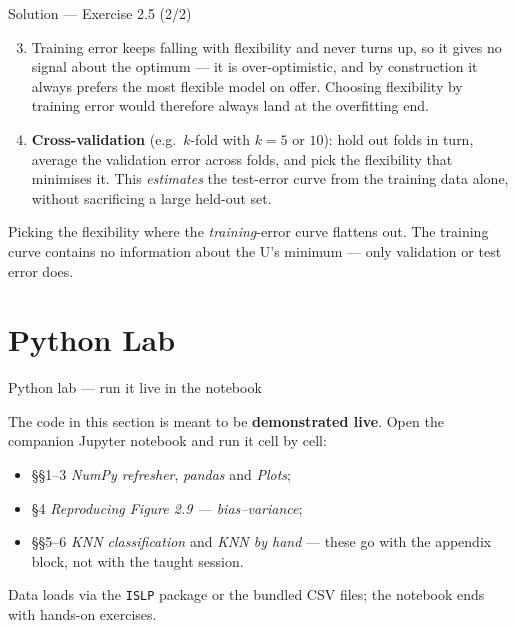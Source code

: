 \documentclass[aspectratio=169,11pt]{beamer}
\begin{document}
\begin{frame}{Solution --- Exercise 2.5 (2/2)}
\begin{solutionbox}
\begin{enumerate}\setcounter{enumi}{2}
  \item Training error keeps falling with flexibility and never turns
        up, so it gives no signal about the optimum --- it is
        over-optimistic, and by construction it always prefers the
        most flexible model on offer. Choosing flexibility by training
        error would therefore always land at the overfitting end.
  \item \textbf{Cross-validation} (e.g.\ $k$-fold with $k=5$ or
        $10$): hold out folds in turn, average the validation error
        across folds, and pick the flexibility that minimises it. This
        \emph{estimates} the test-error curve from the training data
        alone, without sacrificing a large held-out set.
\end{enumerate}
\end{solutionbox}
\begin{mistake}
Picking the flexibility where the
\emph{training}-error curve flattens out. The training curve contains
no information about the U's minimum --- only validation or test error
does.
\end{mistake}
\end{frame}






\section{Python Lab}

\begin{frame}{Python lab --- run it live in the notebook}
  \begin{labnote}
    The code in this section is meant to be \textbf{demonstrated live}. Open the companion Jupyter notebook and run it cell by cell:
    \begin{itemize}
      \item \S\S1--3 \emph{NumPy refresher}, \emph{pandas} and \emph{Plots};
      \item \S4 \emph{Reproducing Figure 2.9 --- bias--variance};
      \item \S\S5--6 \emph{KNN classification} and \emph{KNN by hand} --- these
            go with the appendix block, not with the taught session.
    \end{itemize}
    Data loads via the \texttt{ISLP} package or the bundled CSV files; the notebook ends with hands-on exercises.
  \end{labnote}
\end{frame}
\end{document}
